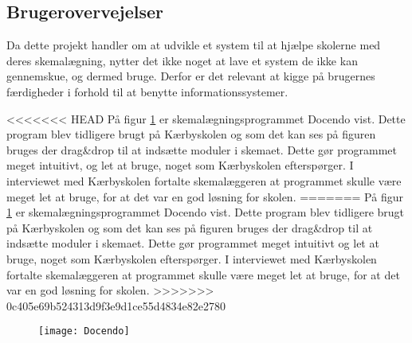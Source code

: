 \subsection{Brugerovervejelser}
Da dette projekt handler om at udvikle et system til at hjælpe skolerne med deres skemalægning, nytter det ikke noget at lave et system de ikke kan gennemskue, og dermed bruge. Derfor er det relevant at kigge på brugernes færdigheder i forhold til at benytte informationssystemer.

<<<<<<< HEAD
På figur \ref{fig:docendo_skema} er skemalægningsprogrammet Docendo vist. Dette program blev tidligere brugt på Kærbyskolen og som det kan ses på figuren bruges der drag\&drop til at indsætte moduler i skemaet. Dette gør programmet meget intuitivt, og let at bruge, noget som Kærbyskolen efterspørger. I interviewet med Kærbyskolen fortalte skemalæggeren at programmet skulle være meget let at bruge, for at det var en god løsning for skolen.
=======
På figur \ref{fig:docendo_skema} er skemalægningsprogrammet Docendo vist. Dette program blev tidligere brugt på Kærbyskolen og som det kan ses på figuren bruges der drag\&drop til at indsætte moduler i skemaet. Dette gør programmet meget intuitivt og let at bruge, noget som Kærbyskolen efterspørger. I interviewet med Kærbyskolen fortalte skemalæggeren at programmet skulle være meget let at bruge, for at det var en god løsning for skolen.
>>>>>>> 0c405e69b524313d9f3e9d1ce55d4834e82e2780

\begin{figure}[h!]
	\centering
	\texttt{[image: Docendo]}
	\label{fig:docendo_skema}
\end{figure}

